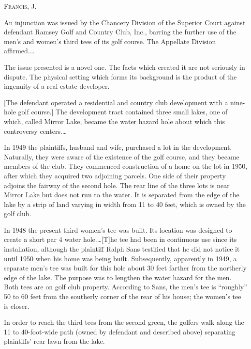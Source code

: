 

\opinion \textsc{Francis}, J.

An injunction was issued by the Chancery Division of the Superior Court against
defendant Ramsey Golf and Country Club, Inc., barring the further use of the
men's and women's third tees of its golf course. The Appellate Division
affirmed.\ldots

The issue presented is a novel one. The facts which created it are not seriously
in dispute. The physical setting which forms its background is the product of
the ingenuity of a real estate developer.

[The defendant operated a residential and country club development with a
nine-hole golf course.] The development tract contained three small lakes, one
of which, called Mirror Lake, became the water hazard hole about which this
controversy centers.\ldots

In 1949 the plaintiffs, husband and wife, purchased a lot in the development.
Naturally, they were aware of the existence of the golf course, and they became
members of the club. They commenced construction of a home on the lot in 1950,
after which they acquired two adjoining parcels. One side of their property
adjoins the fairway of the second hole. The rear line of the three lots is near
Mirror Lake but does not run to the water. It is separated from the edge of the
lake by a strip of land varying in width from 11 to 40 feet, which is owned by
the golf club.

In 1948 the present third women's tee was built. Its location was designed to
create a short par 4 water hole.\ldots [T]he tee had been in continuous use
since its installation, although the plaintiff Ralph Sans testified that he did
not notice it until 1950 when his home was being built. Subsequently, apparently
in 1949, a separate men's tee was built for this hole about 30 feet farther from
the northerly edge of the lake. The purpose was to lengthen the water hazard for
the men. Both tees are on golf club property. According to Sans, the men's tee
is ``roughly'' 50 to 60 feet from the southerly corner of the rear of his house;
the women's tee is closer.

In order to reach the third tees from the second green, the golfers walk along
the 11 to 40-foot-wide path (owned by defendant and described above) separating
plaintiffs' rear lawn from the lake.

